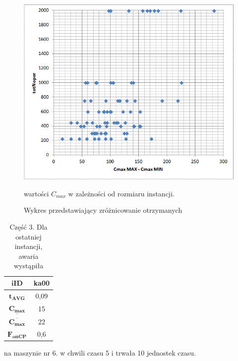 \documentclass[archivemode]{mgr}
\begin{document}
\begin{figure}[t!]
\begin{center}
\includegraphics[scale=0.68]{rysunki/wykres_cmax_iID.png}
\caption{Wykres przedstawiający zróżnicowanie otrzymanych}{wartości $C_{max}$ w zależności od rozmiaru instancji.}
\label{rys_wykres_cmax_iID}
\end{center}
\end{figure}
%
\begin{table}[ht]
\begin{center}
\renewcommand{\arraystretch}{1.2}
\begin{tabular}{|c|c|}
\hline
$\mathbf{iID}$ & \textbf{ka00}\\
\hline
$\mathbf{t_{AVG}}$ & 0,09\\
\hline
$\mathbf{\underline{C_{max}}}$ & 15\\
\hline
$\mathbf{\overline{C_{max}}}$ & 22\\
\hline
$\mathbf{F_{onCP}}$ & 0,6\\
\hline
\end{tabular}
\caption{Część 3. Dla ostatniej instancji, awaria wystąpiła}{na maszynie nr 6. w chwili czasu 5 i trwała 10 jednostek czasu.}
\label{tab_res_three}
\renewcommand{\arraystretch}{1.0}
\end{center}
\end{table}
%

%
\clearpage
{}
\end{document}
